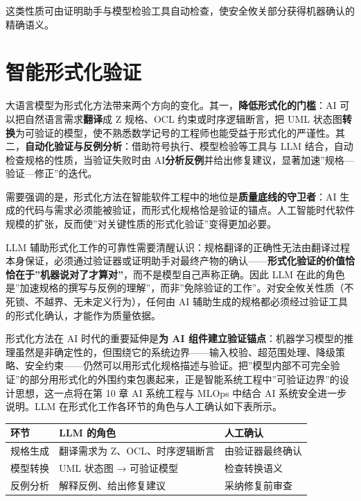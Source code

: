 \documentclass[12pt,a4paper,twoside,openany]{ctexbook}
\numberwithin{figure}{chapter}
\numberwithin{table}{chapter}
\newcounter{none}
\begin{document}
这类性质可由证明助手与模型检验工具自动检查，使安全攸关部分获得机器确认的精确语义。

\section{智能形式化验证}\label{ux667aux80fdux5f62ux5f0fux5316ux9a8cux8bc1}

大语言模型为形式化方法带来两个方向的变化。其一，\textbf{降低形式化的门槛}：AI
可以把自然语言需求\textbf{翻译}成 Z 规格、OCL 约束或时序逻辑断言，把 UML
状态图\textbf{转换}为可验证的模型，使不熟悉数学记号的工程师也能受益于形式化的严谨性。其二，\textbf{自动化验证与反例分析}：借助符号执行、模型检验等工具与
LLM 结合，自动检查规格的性质，当验证失败时由
AI\textbf{分析反例}并给出修复建议，显著加速''规格---验证---修正''的迭代。

需要强调的是，形式化方法在智能软件工程中的地位是\textbf{质量底线的守卫者}：AI
生成的代码与需求必须能被验证，而形式化规格恰是验证的锚点。人工智能时代软件规模的扩张，反而使''对关键性质的形式化验证''变得更加必要。

LLM
辅助形式化工作的可靠性需要清醒认识：规格翻译的正确性无法由翻译过程本身保证，必须通过验证器或证明助手对最终产物的确认------\textbf{形式化验证的价值恰恰在于''机器说对了才算对''}，而不是模型自己声称正确。因此
LLM
在此的角色是''加速规格的撰写与反例的理解''，而非''免除验证的工作''。对安全攸关性质（不死锁、不越界、无未定义行为），任何由
AI 辅助生成的规格都必须经过验证工具的形式化确认，才能作为质量依据。

形式化方法在 AI 时代的重要延伸是\textbf{为 AI
组件建立验证锚点}：机器学习模型的推理虽然是非确定性的，但围绕它的系统边界------输入校验、超范围处理、降级策略、安全约束------仍然可以用形式化规格描述与验证。把''模型内部不可完全验证''的部分用形式化的外围约束包裹起来，正是智能系统工程中''可验证边界''的设计思想，这一点将在第
10 章 AI 系统工程与 MLOps 中结合 AI 系统安全进一步说明。LLM
在形式化工作各环节的角色与人工确认如下表所示。

{\def\LTcaptype{none} %
\begin{longtable}[]{@{}lll@{}}
\toprule\noalign{}
环节 & LLM 的角色 & 人工确认 \\
\midrule\noalign{}
\endhead
\bottomrule\noalign{}
\endlastfoot
规格生成 & 翻译需求为 Z、OCL、时序逻辑断言 & 由验证器最终确认 \\
模型转换 & UML 状态图 → 可验证模型 & 检查转换语义 \\
反例分析 & 解释反例、给出修复建议 & 采纳修复前审查 \\
\end{longtable}
}
\end{document}
